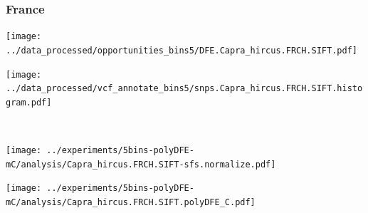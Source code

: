 \subsubsection{France}

\begin{minipage}{0.49\linewidth}
    \texttt{[image: ../data\_processed/opportunities\_bins5/DFE.Capra\_hircus.FRCH.SIFT.pdf]}
\end{minipage}
\begin{minipage}{0.49\linewidth}
    \texttt{[image: ../data\_processed/vcf\_annotate\_bins5/snps.Capra\_hircus.FRCH.SIFT.histogram.pdf]}
\end{minipage}
\\
\begin{minipage}{0.49\linewidth}
    \texttt{[image: ../experiments/5bins-polyDFE-mC/analysis/Capra\_hircus.FRCH.SIFT-sfs.normalize.pdf]}
\end{minipage}
\begin{minipage}{0.4\linewidth}
    \texttt{[image: ../experiments/5bins-polyDFE-mC/analysis/Capra\_hircus.FRCH.SIFT.polyDFE\_C.pdf]}
\end{minipage}
